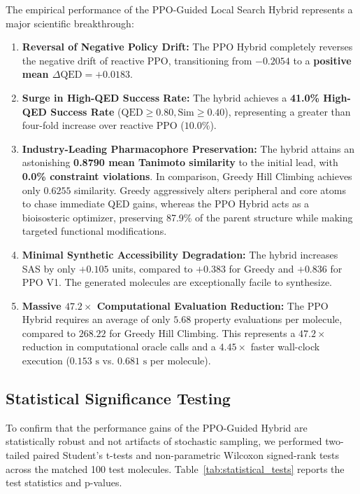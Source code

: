 \documentclass{ieeeaccess}
\begin{document}
The empirical performance of the PPO-Guided Local Search Hybrid represents a major scientific breakthrough:
\begin{enumerate}
    \item \textbf{Reversal of Negative Policy Drift:} The PPO Hybrid completely reverses the negative drift of reactive PPO, transitioning from $-0.2054$ to a \textbf{positive mean $\Delta\text{QED} = +0.0183$}.
    \item \textbf{Surge in High-QED Success Rate:} The hybrid achieves a \textbf{41.0\% High-QED Success Rate} ($\text{QED} \ge 0.80, \text{Sim} \ge 0.40$), representing a greater than four-fold increase over reactive PPO ($10.0\%$).
    \item \textbf{Industry-Leading Pharmacophore Preservation:} The hybrid attains an astonishing \textbf{0.8790 mean Tanimoto similarity} to the initial lead, with \textbf{0.0\% constraint violations}. In comparison, Greedy Hill Climbing achieves only $0.6255$ similarity. Greedy aggressively alters peripheral and core atoms to chase immediate QED gains, whereas the PPO Hybrid acts as a bioisosteric optimizer, preserving 87.9\% of the parent structure while making targeted functional modifications.
    \item \textbf{Minimal Synthetic Accessibility Degradation:} The hybrid increases SAS by only $\mathbf{+0.105}$ units, compared to $+0.383$ for Greedy and $+0.836$ for PPO V1. The generated molecules are exceptionally facile to synthesize.
    \item \textbf{Massive $47.2\times$ Computational Evaluation Reduction:} The PPO Hybrid requires an average of only $\mathbf{5.68}$ property evaluations per molecule, compared to $\mathbf{268.22}$ for Greedy Hill Climbing. This represents a $\mathbf{47.2\times}$ reduction in computational oracle calls and a $4.45\times$ faster wall-clock execution ($0.153\text{ s}$ vs. $0.681\text{ s}$ per molecule).
\end{enumerate}

\subsection{Statistical Significance Testing}
To confirm that the performance gains of the PPO-Guided Hybrid are statistically robust and not artifacts of stochastic sampling, we performed two-tailed paired Student's t-tests and non-parametric Wilcoxon signed-rank tests across the matched 100 test molecules. Table~\ref{tab:statistical_tests} reports the test statistics and p-values.
\end{document}
